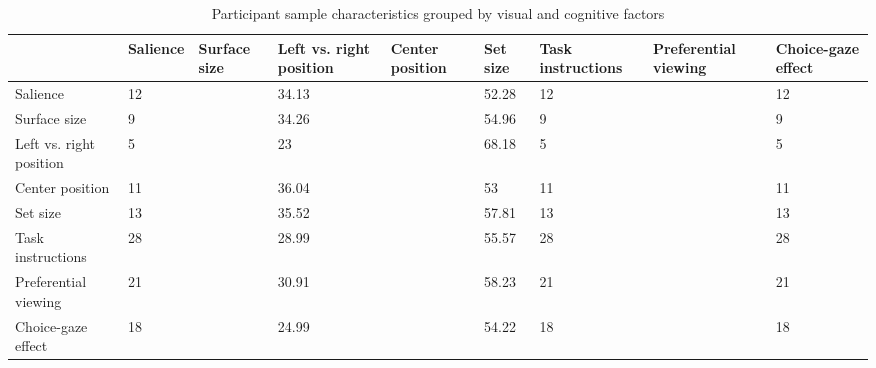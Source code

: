 \begin{table}[ht]
\centering
\caption{Participant sample characteristics grouped by visual and cognitive factors} 
\label{tab:sampleTable}
\begingroup\small
\begin{tabular}{lp{.07\linewidth}p{.07\linewidth}p{.09\linewidth}p{.09\linewidth}p{.07\linewidth}p{.08\linewidth}p{.1\linewidth}p{.07\linewidth}}
  \hline
  & Salience & Surface size & Left vs. right position & Center position & Set size & Task instructions & Preferential viewing & Choice-gaze effect \\ 
  \hline
Salience & 12 &  & 34.13 &  & 52.28 & 12 &  & 12 \\ 
  Surface size & 9 &  & 34.26 &  & 54.96 & 9 &  & 9 \\ 
  Left vs. right position & 5 &  & 23 &  & 68.18 & 5 &  & 5 \\ 
  Center position & 11 &  & 36.04 &  & 53 & 11 &  & 11 \\ 
  Set size & 13 &  & 35.52 &  & 57.81 & 13 &  & 13 \\ 
  Task instructions & 28 &  & 28.99 &  & 55.57 & 28 &  & 28 \\ 
  Preferential viewing & 21 &  & 30.91 &  & 58.23 & 21 &  & 21 \\ 
  Choice-gaze effect & 18 &  & 24.99 &  & 54.22 & 18 &  & 18 \\ 
   \hline
\end{tabular}
\endgroup
\end{table}
